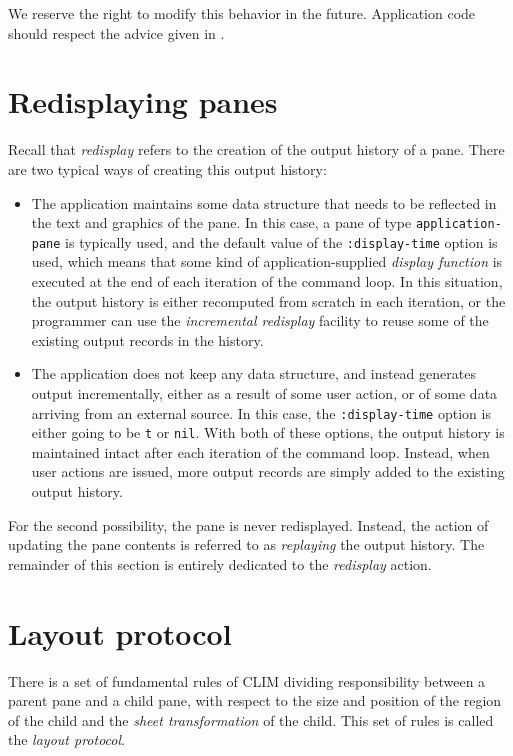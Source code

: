 We reserve the right to modify this behavior in the future.
Application code should respect the advice given in
.

\section{Redisplaying panes}

Recall that \emph{redisplay} refers to the creation of the output
history of a pane.  There are two typical ways of creating this output
history:

\begin{itemize}
\item The application maintains some data structure that needs to be
  reflected in the text and graphics of the pane.  In this case,
  a pane of type \texttt{application-pane} is typically used, and the
  default value of the \texttt{:display-time} option is used, which
  means that some kind of application-supplied \emph{display function}
  is executed at the end of each iteration of the command loop.  In
  this situation, the output history is either recomputed from scratch
  in each iteration, or the programmer can use the \emph{incremental
    redisplay} facility to reuse some of the existing output records
  in the history.
\item The application does not keep any data structure, and instead
  generates output incrementally, either as a result of some user
  action, or of some data arriving from an external source.  In this
  case, the \texttt{:display-time} option is either going to be
  \texttt{t} or \texttt{nil}.  With both of these options, the output
  history is maintained intact after each iteration of the command
  loop.  Instead, when user actions are issued, more output records
  are simply added to the existing output history.
\end{itemize}

For the second possibility, the pane is never redisplayed.  Instead,
the action of updating the pane contents is referred to as
\emph{replaying} the output history.  The remainder of this section is
entirely dedicated to the \emph{redisplay} action.

\section{Layout protocol}

There is a set of fundamental rules of CLIM dividing responsibility
between a parent pane and a child pane, with respect to the size and
position of the region of the child and the \emph{sheet transformation}
of the child.  This set of rules is called the \emph{layout protocol}.

